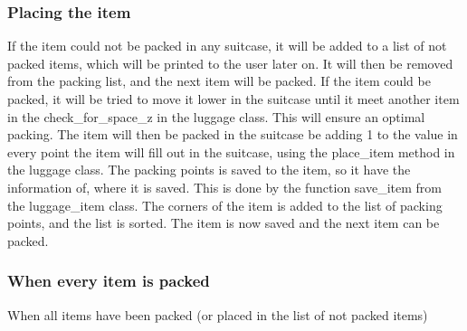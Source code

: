 \subsubsection{Placing the item}
If the item could not be packed in any suitcase, it will be added to a list of not packed items, which will be printed to the user later on. It will then be removed from the packing list, and the next item will be packed. If the item could be packed, it will be tried to move it lower in the suitcase until it meet another item in the check\_for\_space\_z in the luggage class. This will ensure an optimal packing. The item will then be packed in the suitcase be adding 1 to the value in every point the item will fill out in the suitcase, using the place\_item method in the luggage class. The packing points is saved to the item, so it have the information of, where it is saved. This is done by the function save\_item from the luggage\_item class. The corners of the item is added to the list of packing points, and the list is sorted. The item is now saved and the next item can be packed.
\subsubsection{When every item is packed}
When all items have been packed (or placed in the list of not packed items)
